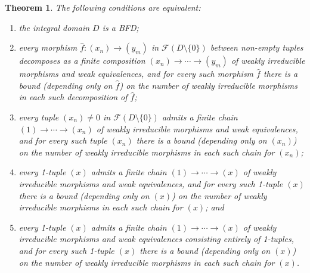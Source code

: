 \documentclass[reqno]{amsart}
\theoremstyle{plain}
\newtheorem{thm}[lem]{Theorem}
\theoremstyle{definition}
\newcommand{\cat}[1]{\mathcal{#1}}
\newcommand{\catf}{\cat{F}}
\newcommand{\emptytuple}{\mathfrak{0}}
\numberwithin{equation}{lem}
\begin{document}
\begin{thm}\label{prop170710z}
The following conditions are equivalent:
\begin{enumerate}[\rm(i)]
\item\label{prop170710z1}
the integral domain $D$ is a BFD;
\item\label{prop170710z2}
every morphism $\hat f\colon (x_n)\to(y_m)$ in $\catf(D \setminus \{0\})$ between non-empty tuples decomposes as a finite composition
$(x_n)\to\cdots\to(y_m)$ of 
weakly
irreducible morphisms and weak equivalences, and for every such morphism $\hat f$ 
there is a bound (depending only on $\hat f$) on the number of 
weakly
irreducible morphisms in each such decomposition of $\hat f$;
\item\label{prop170710z3}
every tuple $(x_n)\neq\emptytuple$ in $\catf(D \setminus \{0\})$ admits a finite chain
$(1)\to\cdots\to(x_n)$ of 
weakly
irreducible morphisms and weak equivalences, and for every such tuple $(x_n)$ 
there is a bound (depending only on $(x_n)$) on the number of 
weakly
irreducible morphisms in each such chain
for $(x_n)$; 
\item\label{prop170710z4}
every 1-tuple $(x)$ admits a finite chain
$(1)\to\cdots\to(x)$ of 
weakly
irreducible morphisms and weak equivalences, and 
for every such 1-tuple $(x)$ 
there is a bound (depending only on $(x)$) on the number of 
weakly
irreducible morphisms in each such chain
for $(x)$; and
\item\label{prop170710z4'}
every 1-tuple $(x)$ admits a finite chain
$(1)\to\cdots\to(x)$ of 
weakly
irreducible morphisms and weak equivalences consisting entirely of 1-tuples, and 
for every such 1-tuple $(x)$ 
there is a bound (depending only on $(x)$) on the number of 
weakly
irreducible morphisms in each such chain
for $(x)$.
\end{enumerate}
\end{thm}
\end{document}
